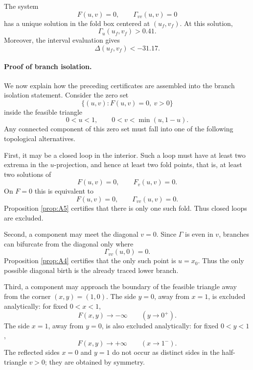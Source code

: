 \begin{proposition}\label{prop:A5}
The system
\begin{equation}\label{eq:fold_system_app}
  F(u,v)=0,
  \qquad
  \Gamma_{vv}(u,v)=0
\end{equation}
has a unique solution in the fold box centered at \((u_f,v_f)\).  At this
solution,
\begin{equation}\label{eq:fold_Gammau_app}
  \Gamma_u(u_f,v_f)>0.41.
\end{equation}
Moreover, the interval evaluation gives
\begin{equation}\label{eq:fold_delta_app}
  \Delta(u_f,v_f)<-31.17.
\end{equation}
\end{proposition}

\paragraph{Proof of branch isolation.}
We now explain how the preceding certificates are assembled into the branch
isolation statement.  Consider the zero set
\[
  \{(u,v):F(u,v)=0,\ v>0\}
\]
inside the feasible triangle
\[
  0<u<1,
  \qquad
  0<v<\min(u,1-u).
\]
Any connected component of this zero set must fall into one of the following
topological alternatives.

First, it may be a closed loop in the interior.  Such a loop must have at
least two extrema in the \(u\)-projection, and hence at least two fold points,
that is, at least two solutions of
\[
  F(u,v)=0,
  \qquad
  F_v(u,v)=0.
\]
On \(F=0\) this is equivalent to
\[
  F(u,v)=0,
  \qquad
  \Gamma_{vv}(u,v)=0.
\]
Proposition \ref{prop:A5} certifies that there is only one such fold.  Thus
closed loops are excluded.

Second, a component may meet the diagonal \(v=0\).  Since \(\Gamma\) is even in
\(v\), branches can bifurcate from the diagonal only where
\[
  \Gamma_{vv}(u,0)=0.
\]
Proposition \ref{prop:A4} certifies that the only such point is \(u=x_0\).
Thus the only possible diagonal birth is the already traced lower branch.

Third, a component may approach the boundary of the feasible triangle away
from the corner \((x,y)=(1,0)\).  The side \(y=0\), away from \(x=1\), is
excluded analytically: for fixed \(0<x<1\),
\[
  F(x,y)\to -\infty
  \qquad (y\to0^+).
\]
The side \(x=1\), away from \(y=0\), is also excluded analytically: for fixed
\(0<y<1\),
\[
  F(x,y)\to +\infty
  \qquad (x\to1^-).
\]
The reflected sides \(x=0\) and \(y=1\) do not occur as distinct sides in the
half-triangle \(v>0\); they are obtained by symmetry.

